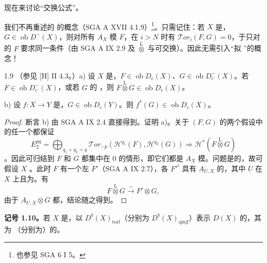 现在来讨论“交换公式”。

我们不再重述的 的概念（SGA A XVII 4.1.9）\begingroup\renewcommand{\thefootnote}{*}\footnote{也参见 SGA 6 I 5。}\endgroup 。只需记住：若 $X$ 是，$G\in\operatorname{ob}D^-(X)$，则对所有 $A_X$ 模 $F$，在 $i>N$ 时有 $\mathcal Tor_i(F,G)=0$，于只对的 $F$ 要求同一条件（由 SGA A IX 2.9 及 $\mathbin{\overset{\mathrm L}{\otimes}}$ 与可交换）。因此无需引入“拟 ”的概念！

\begin{SGAresult}{}{1.9}
（参见 [H] II 4.3。）a) 设 $X$ 是，$F\in\operatorname{ob}D_c(X)$、$G\in\operatorname{ob}D_c^-(X)$。若 $F\in\operatorname{ob}D_c^-(X)$，或若 $G$ 的 ，则 $F\mathbin{\overset{\mathrm L}{\otimes}}G\in\operatorname{ob}D_c(X)$。

b) 设 $f:X\longrightarrow Y$ 是，$G\in\operatorname{ob}D_c(Y)$。则 $f^*(G)\in\operatorname{ob}D_c(X)$。
\end{SGAresult}
\begin{proof}
断言 b) 由 SGA A IX 2.4 直接得到。证明 a)。关于 $(F,G)$ 的两个假设中的任一个都保证
\[
 E_2^{pq}=\bigoplus_{q_1+q_2=q}\mathcal Tor_{-p}(\mathcal H^{q_1}(F),\mathcal H^{q_2}(G))
 \Longrightarrow\mathcal H^*(F\mathbin{\overset{\mathrm L}{\otimes}}G)
\]
。因此可归结到 $F$ 和 $G$ 都集中在 $0$ 的情形，即它们都是 $A_X$ 模。问题是的，故可假设 $X$ 。此时 $F$ 有一个左 $F'$（SGA A IX 2.7），各 $F'^i$ 具有 $A_{U,X}$ 的，其中 $U$ 在 $X$ 上且为。有
\[
 F\mathbin{\overset{\mathrm L}{\otimes}}G\xrightarrow{\sim}F'\otimes G,
\]
由于 $A_{U,X}\otimes G$ 都，结论随之得到。
\end{proof}
\textbf{记号 1.10。}若 $X$ 是，以 $D^b(X)_{\mathrm{torf}}$（分别为 $D^b(X)_{\mathrm{qinjf}}$）表示 $D(X)$ 的，其为 （分别为）的。

